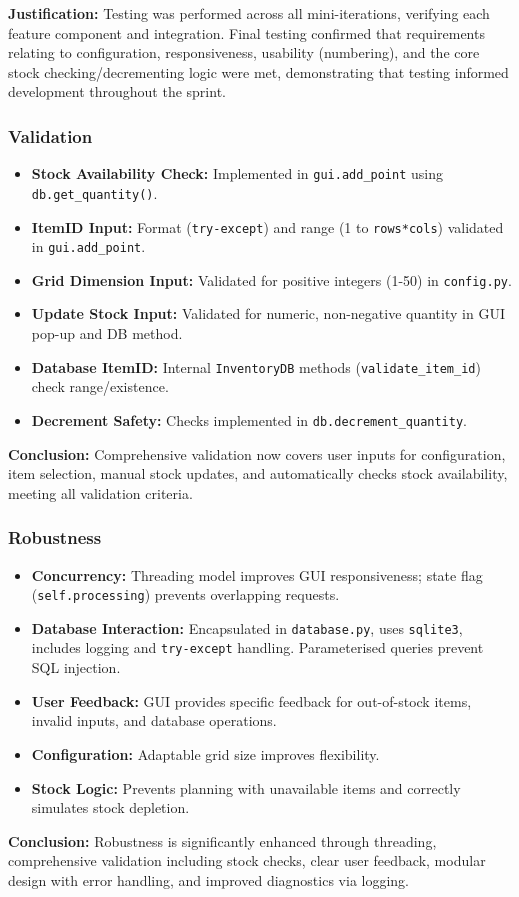 \newpage

\textbf{Justification:} Testing was performed across all mini-iterations, verifying each feature component and integration. Final testing confirmed that requirements relating to configuration, responsiveness, usability (numbering), and the core stock checking/decrementing logic were met, demonstrating that testing informed development throughout the sprint.

\subsubsection{Validation}
	\begin{itemize}
		\item \textbf{Stock Availability Check:} Implemented in \verb|gui.add_point| using \verb|db.get_quantity()|.
		\item \textbf{ItemID Input:} Format (\verb|try-except|) and range (1 to \verb|rows*cols|) validated in \verb|gui.add_point|.
		\item \textbf{Grid Dimension Input:} Validated for positive integers (1-50) in \verb|config.py|.
		\item \textbf{Update Stock Input:} Validated for numeric, non-negative quantity in GUI pop-up and DB method.
		\item \textbf{Database ItemID:} Internal \verb|InventoryDB| methods (\verb|validate_item_id|) check range/existence.
		\item \textbf{Decrement Safety:} Checks implemented in \verb|db.decrement_quantity|.
	\end{itemize}
	\textbf{Conclusion:} Comprehensive validation now covers user inputs for configuration, item selection, manual stock updates, and automatically checks stock availability, meeting all validation criteria.
	
\subsubsection{Robustness}
	\begin{itemize}
		\item \textbf{Concurrency:} Threading model improves GUI responsiveness; state flag (\verb|self.processing|) prevents overlapping requests.
		\item \textbf{Database Interaction:} Encapsulated in \verb|database.py|, uses \verb|sqlite3|, includes logging and \verb|try-except| handling. Parameterised queries prevent SQL injection.
		\item \textbf{User Feedback:} GUI provides specific feedback for out-of-stock items, invalid inputs, and database operations.
		\item \textbf{Configuration:} Adaptable grid size improves flexibility.
		\item \textbf{Stock Logic:} Prevents planning with unavailable items and correctly simulates stock depletion.
	\end{itemize}
	\textbf{Conclusion:} Robustness is significantly enhanced through threading, comprehensive validation including stock checks, clear user feedback, modular design with error handling, and improved diagnostics via logging.
		
